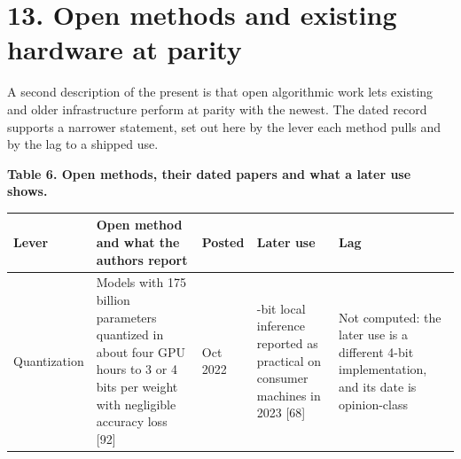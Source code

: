 \documentclass[10pt,letterpaper]{article}
\newcounter{none}
\begin{document}
\section{13. Open methods and existing hardware at
parity}\label{open-methods-and-existing-hardware-at-parity}

A second description of the present is that open algorithmic work lets
existing and older infrastructure perform at parity with the newest. The
dated record supports a narrower statement, set out here by the lever
each method pulls and by the lag to a shipped use.

\textbf{Table 6. Open methods, their dated papers and what a later use
shows.}

{\def\LTcaptype{none} %
{\footnotesize\setlength{\tabcolsep}{3.8pt}\renewcommand{\arraystretch}{1.15}
\begin{longtable}[]{@{}
  >{\raggedright\arraybackslash}p{}
  >{\raggedright\arraybackslash}p{}
  >{\raggedright\arraybackslash}p{}
  >{\raggedright\arraybackslash}p{}
  >{\raggedright\arraybackslash}p{}@{}}
\toprule\noalign{}
\begin{minipage}[b]{\linewidth}\raggedright
\textbf{Lever}
\end{minipage} & \begin{minipage}[b]{\linewidth}\raggedright
\textbf{Open method and what the authors report}
\end{minipage} & \begin{minipage}[b]{\linewidth}\raggedright
\textbf{Posted}
\end{minipage} & \begin{minipage}[b]{\linewidth}\raggedright
\textbf{Later use}
\end{minipage} & \begin{minipage}[b]{\linewidth}\raggedright
\textbf{Lag}
\end{minipage} \\
\midrule\noalign{}
\endhead
\bottomrule\noalign{}
\endlastfoot
Quantization & Models with 175 billion parameters quantized in about
four GPU hours to 3 or 4 bits per weight with negligible accuracy loss
{[}92{]} & Oct 2022 & 4-bit local inference reported as practical on
consumer machines in 2023 {[}68{]} & Not computed: the later use is a
different 4-bit implementation, and its date is opinion-class

\end{longtable}}}
\end{document}
